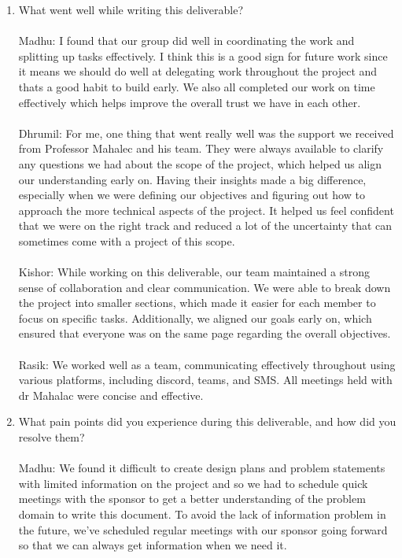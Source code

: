 \documentclass{article}
\begin{document}
\begin{enumerate}
    \item What went well while writing this deliverable? 
    \\\\ Madhu: I found that our group did well in coordinating the work and splitting up tasks effectively. I think this is a good sign for future work since it means we should do well at delegating work throughout the project and thats a good habit to build early. We also all completed our work on time effectively which helps improve the overall trust we have in each other. 
    \\\\ Dhrumil: For me, one thing that went really well was the support we received from Professor Mahalec and his team. They were always available to clarify any questions we had about the scope of the project, which helped us align our understanding early on. Having their insights made a big difference, especially when we were defining our objectives and figuring out how to approach the more technical aspects of the project. It helped us feel confident that we were on the right track and reduced a lot of the uncertainty that can sometimes come with a project of this scope.
    \\\\ Kishor: While working on this deliverable, our team maintained a strong sense of collaboration and clear communication. We were able to break down the project into smaller sections, which made it easier for each member to focus on specific tasks. Additionally, we aligned our goals early on, which ensured that everyone was on the same page regarding the overall objectives.
     \\\\ Rasik: We worked well as a team, communicating effectively throughout using various platforms, including discord, teams, and SMS. All meetings held with dr Mahalac were concise and effective.
    \item What pain points did you experience during this deliverable, and how
    did you resolve them?
    \\\\ Madhu: We found it difficult to create design plans and problem statements with limited information on the project and so we had to schedule quick meetings with the sponsor to get a better understanding of the problem domain to write this document. To avoid the lack of information problem in the future, we've scheduled regular meetings with our sponsor going forward so that we can always get information when we need it. 

\end{enumerate}
\end{document}
